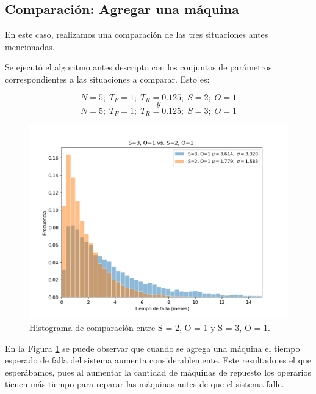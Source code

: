     \pagebreak

    \subsection{Comparación: Agregar una máquina}

    \par En este caso, realizamos una comparación de las tres situaciones antes
    mencionadas.
    \par Se ejecutó el algoritmo antes descripto con los conjuntos de parámetros
    correspondientes a las situaciones a comparar. Esto es:

    \[
      N = 5; \; T_F = 1; \; T_R = 0.125; \; S = 2; \; O = 1
    \]
    \[y\]
    \[
      N = 5; \; T_F = 1; \; T_R = 0.125; \; S = 3; \; O = 1
    \]


    \begin{figure}[h]
        \centering
        \includegraphics[scale=0.8]{images/S3O1vsS2O1.png}
        \caption{Histograma de comparación entre S = 2, O = 1 y S = 3, O = 1.}
        \label{fig:S2O1vsS3O1}
    \end{figure}
    \vspace{5mm}


    \par En la Figura \ref{fig:S2O1vsS3O1} se puede observar que cuando se agrega una
    máquina el tiempo esperado de falla
    del sistema aumenta considerablemente. Este resultado es el que esperábamos, pues al
    aumentar la cantidad de máquinas de repuesto los operarios tienen más tiempo para
    reparar las máquinas antes de que el sistema falle.

